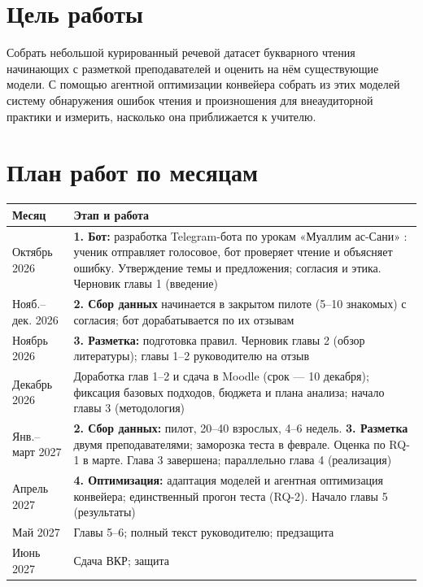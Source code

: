 \documentclass[a4paper,14pt]{extarticle}
\begin{document}
\section{Цель работы}

Собрать небольшой курированный речевой датасет букварного чтения начинающих с разметкой преподавателей и
оценить на нём существующие модели. С помощью агентной оптимизации конвейера собрать из этих моделей
систему обнаружения ошибок чтения и произношения для внеаудиторной практики и измерить, насколько она
приближается к учителю.

\section{План работ по месяцам}

\begin{table}[ht]
\centering\small
\begin{tabularx}{\linewidth}{@{}P{3.4cm}L@{}}
\toprule
Месяц & Этап и работа \\
\midrule
Октябрь 2026 & \textbf{1. Бот:} разработка Telegram-бота по урокам «Муаллим ас-Сани» \cite{SRC-040}:
  ученик отправляет голосовое, бот проверяет чтение и объясняет ошибку. Утверждение темы и предложения;
  согласия и этика. Черновик главы 1 (введение) \\
Нояб.--дек. 2026 & \textbf{2. Сбор данных} начинается в закрытом пилоте (5--10 знакомых) с согласия; бот
  дорабатывается по их отзывам \\
Ноябрь 2026 & \textbf{3. Разметка:} подготовка правил. Черновик главы 2 (обзор литературы); главы 1--2
  руководителю на отзыв \\
Декабрь 2026 & Доработка глав 1--2 и сдача в Moodle (срок --- 10 декабря); фиксация базовых подходов,
  бюджета и плана анализа; начало главы 3 (методология) \\
Янв.--март 2027 & \textbf{2. Сбор данных:} пилот, 20--40 взрослых, 4--6 недель. \textbf{3. Разметка} двумя
  преподавателями; заморозка теста в феврале. Оценка по RQ-1 в марте. Глава 3 завершена; параллельно
  глава 4 (реализация) \\
Апрель 2027 & \textbf{4. Оптимизация:} адаптация моделей и агентная оптимизация конвейера; единственный
  прогон теста (RQ-2). Начало главы 5 (результаты) \\
Май 2027 & Главы 5--6; полный текст руководителю; предзащита \\
Июнь 2027 & Сдача ВКР; защита \\
\bottomrule
\end{tabularx}
\end{table}

\printbibliography[heading=bibintoc,title={Список источников}]
\end{document}
